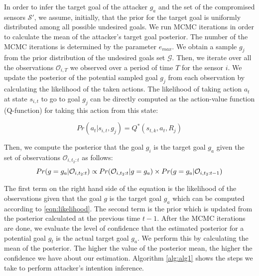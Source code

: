 \documentclass[letterpaper, 10 pt, conference]{ieeeconf}  %
\begin{document}
In order to infer the target goal of the attacker $g_a$ and the set of the compromised sensors $\mathcal{S}'$, we assume, initially, that the prior for the target goal is uniformly distributed among all possible undesired goals. We run MCMC iterations in order to calculate the mean of the attacker's target goal posterior. The number of the MCMC iterations is determined by the parameter ${e}_{max}$. We obtain a sample $g_j$ from the prior distribution of the undesired goals set $\mathcal{G}$. Then, we iterate over all the observations $\mathcal{O}_{i,T}$ we observed over a period of time $T$ for the sensor $i$. We update the posterior of the potential sampled goal $g_j$ from each observation by calculating the likelihood of the taken actions. The likelihood of taking action $a_t$ at state $s_{i,t}$ to go to goal $g_j$ can be directly computed as the action-value function (Q-function) for taking this action from this state:

\begin{equation} Pr(a_t|s_{i,t},g_j) = Q^*(s_{t,k},a_t,R_j)
\label{eqn:action_likelihood}
\end{equation}

Then, we compute the posterior that the goal $g_i$ is the target goal $g_a$ given the set of observations $\mathcal{O}_{i,t_2:t}$ as follows:
\begin{equation} Pr(g=g_a|\mathcal{O}_{i,t_2:t}) \propto Pr(\mathcal{O}_{i,t_2:t} | g = g_a) \\ \times Pr(g=g_a|\mathcal{O}_{i,t_2:t-1})
\label{eqn:goal_posterior}
\end{equation}

The first term on the right hand side of the equation is the likelihood of the observations given that the goal $g$ is the target goal $g_a$ which can be computed according to \ref{eqn:likelihood}. The second term is the prior which is updated from the posterior calculated at the previous time $t-1$.
After the MCMC iterations are done, we evaluate the level of confidence that the estimated posterior for a potential goal $g_t$ is the actual target goal $g_a$. We perform this by calculating the mean of the posterior. The higher the value of the posterior mean, the higher the confidence we have about our estimation. Algorithm \ref{alg:alg1} shows the steps we take to perform attacker's intention inference.
\end{document}
